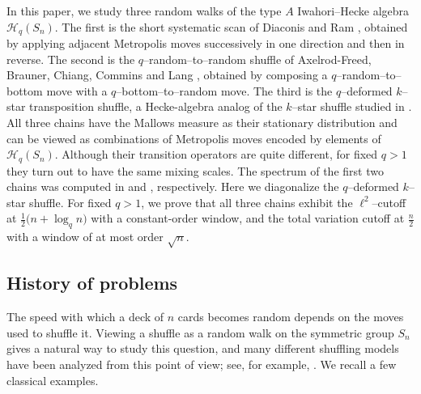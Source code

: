 \documentclass[11pt]{article}
\theoremstyle{plain}  %
\begin{document}
In this paper, we study three random walks of the type $A$ Iwahori--Hecke algebra $\mathcal{H}_q(S_n)$. The first is the short systematic scan of Diaconis and Ram \cite{DiaconisRam2000}, obtained by applying adjacent Metropolis moves successively in one direction and then in reverse. The second is the $q$--random--to--random shuffle of Axelrod-Freed, Brauner, Chiang, Commins and Lang \cite{AxelrodFreedBraunerChiangComminsLang2024}, obtained by composing a $q$--random--to--bottom move with a $q$--bottom--to--random move. The third is the $q$--deformed $k$--star transposition shuffle, a Hecke-algebra analog of the $k$--star shuffle studied in \cite{arfaee2025shuffling}. All three chains have the Mallows measure as their stationary distribution and can be viewed as combinations of Metropolis moves encoded by elements of $\mathcal{H}_q(S_n)$. Although their transition operators are quite different, for fixed $q>1$ they turn out to have the same mixing scales.
The spectrum of the first two chains was computed in \cite{DiaconisRam2000} and \cite{AxelrodFreedBraunerChiangComminsLang2024}, respectively. Here we diagonalize the $q$--deformed $k$--star shuffle. For fixed $q>1$, we prove that all three chains exhibit the $\ell^2$--cutoff at $\frac12\bigl(n+\log_q n\bigr)$ with a constant-order window, and the total variation cutoff at $\frac{n}{2}$ with a window of at most order $\sqrt n$. 


\subsection{History of problems}\label{sec:History}


The speed with which a deck of $n$ cards becomes random depends on the moves used to shuffle it. Viewing a shuffle as a random walk on the symmetric group $S_n$ gives a natural way to study this question, and many different shuffling models have been analyzed from this point of view; see, for example,
\cite{10.1214/20-AAP1632,
BD,
bernstein2019cutoff,
DiaconisSaloffCoste1993,
Diaconis1981,
Dieker2018,
Matthews1988,
MorrisNingPeres2014,
MorrisQin2017,
MosselPeresSinclair2004,
NamNestoridi2019,
SaloffCosteZuniga2008,
Subag,
Teyssier2019,
UyemuraReyes2002}.
We recall a few classical examples.


\end{document}
